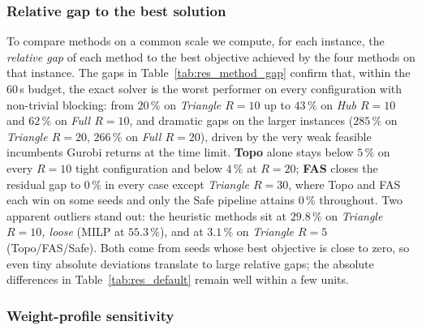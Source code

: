 

\subsubsection{Relative gap to the best solution}

To compare methods on a common scale we compute, for each instance, the
\emph{relative gap} of each method to the best objective achieved by the
four methods on that instance.  The gaps in
Table~\ref{tab:res_method_gap} confirm that, within the 60\,s budget,
the exact solver is the worst performer on every configuration with
non-trivial blocking: from $20\,\%$ on \emph{Triangle $R{=}10$} up to
$43\,\%$ on \emph{Hub $R{=}10$} and $62\,\%$ on \emph{Full $R{=}10$},
and dramatic gaps on the larger instances ($285\,\%$ on
\emph{Triangle $R{=}20$}, $266\,\%$ on \emph{Full $R{=}20$}), driven by
the very weak feasible incumbents Gurobi returns at the time limit.
\textbf{Topo} alone stays below $5\,\%$ on every $R{=}10$ tight
configuration and below $4\,\%$ at $R{=}20$; \textbf{FAS} closes the
residual gap to $0\,\%$ in every case except \emph{Triangle $R{=}30$},
where Topo and FAS each win on some seeds and only the Safe pipeline
attains $0\,\%$ throughout.  Two apparent outliers stand out: the heuristic methods sit at
$29.8\,\%$ on \emph{Triangle $R{=}10$, loose} (MILP at $55.3\,\%$),
and at $3.1\,\%$ on \emph{Triangle $R{=}5$} (Topo/FAS/Safe).  Both come from
seeds whose best objective is close to zero, so even tiny absolute
deviations translate to large relative gaps; the absolute differences
in Table~\ref{tab:res_default} remain well within a few units.



\subsubsection{Weight-profile sensitivity}

